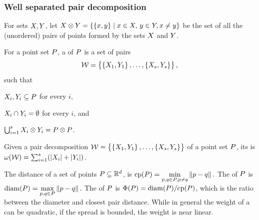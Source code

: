 \documentclass[12pt]{article}%
\begin{document}
\subsubsection{Well separated pair decomposition}

For sets $X, Y$, let
\begin{math}
    \PSX \otimes \PSY%
    =%
    \Set{\brc{\px,\py}}{ \px\in \PSX,\, \py\in \PSY, \px \ne \py }
\end{math}
be the set of all the (unordered) pairs of points formed by the sets
$X$ and $Y$.

\begin{defn}
    For a point set $P$, a  of $P$ is a set of pairs
    \begin{equation*}
        \mathcal{W} = \left\{ {\bigl. \left\{ {X_1,Y_1} \right\},\ldots,\left\{ {X_s,Y_s} \right\}} \right\},
    \end{equation*}
    such that
    \begin{enumerate*}[label=(\Roman*)]
        \item $X_i,Y_i\subseteq P$ for every $i$,
        \item $X_i \cap Y_i = \emptyset$ for every $i$, and
        \item
        $\bigcup_{i=1}^s X_i \otimes Y_i = P \otimes P$.
    \end{enumerate*}
\end{defn}

\begin{defn}
    Given a pair decomposition
    $\mathcal{W} = \left\{ {\bigl. \left\{ {X_1,Y_1} \right\},\ldots,\left\{ {X_s,
          Y_s} \right\}} \right\}$ of a point set $P$, its  is
    $\WeightX{\WS} = \sum_{i=1}^s \pth{ \cardin{\PSX_i } +
       \cardin{\PSY_i}}$.
\end{defn}

The  distance of a set of points
$P \subseteq \mathbb{R}^d$, is
\begin{math}
\cpX{\PS} = \underset{\pa, \pb \in \PS, \pa \neq \pb}{\min} \dY{\pa}{\pb}.
\end{math}
The  of $P$ is
\begin{math}
\diamX{\PS} = \underset{\pa, \pb \in \PS}{\max}\dY{\pa}{\pb}.
\end{math}
The  of $P$ is
$\spreadX{\PS} = \diamX{\PS} / \cpX{\PS}$, which is the ratio between
the diameter and closest pair distance.  While in general the weight
of a \WSPD can be quadratic, if the spread is bounded, the weight is
near linear.
\end{document}
